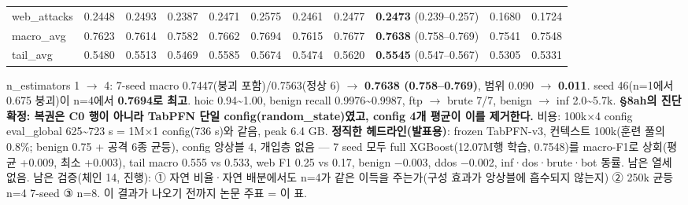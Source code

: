 \begin{landscape}
\begin{longtable}
{}web\_\allowbreak{}attacks & 0.2448 & 0.2493 & 0.2387 & 0.2471 & 0.2575 & 0.2461 & 0.2477 & \textbf{0.2473} (0.239–0.257) & 0.1680 & 0.1724 \\
{}macro\_\allowbreak{}avg & 0.7623 & 0.7614 & 0.7582 & 0.7662 & 0.7694 & 0.7615 & 0.7677 & \textbf{0.7638} (0.758–0.769) & 0.7541 & 0.7548 \\
{}tail\_\allowbreak{}avg & 0.5480 & 0.5513 & 0.5469 & 0.5585 & 0.5674 & 0.5474 & 0.5620 & \textbf{0.5545} (0.547–0.567) & 0.5305 & 0.5331 \\
\bottomrule
\end{longtable}
\endgroup
\end{landscape}
n\_\allowbreak{}estimators 1  \ensuremath{\rightarrow}  4: 7-seed macro 0.7447(붕괴 포함)/\allowbreak{}0.7563(정상 6)  \ensuremath{\rightarrow}  \textbf{0.7638 (0.758–0.769)}, 범위 0.090  \ensuremath{\rightarrow}  \textbf{0.011}. seed 46(n=\allowbreak{}1에서 0.675 붕괴)이 n=\allowbreak{}4에서 \textbf{0.7694로 최고}. hoic 0.94\textasciitilde{}1.00, benign recall 0.9976\textasciitilde{}0.9987, ftp \ensuremath{\rightarrow} brute 7/\allowbreak{}7, benign \ensuremath{\rightarrow} inf 2.0\textasciitilde{}5.7k. \textbf{§8ah의 진단 확정: 복권은 C0 행이 아니라 TabPFN 단일 config(random\_\allowbreak{}state)였고, config 4개 평균이 이를 제거한다.} 비용: 100k×4 config eval\_\allowbreak{}global 625\textasciitilde{}723 s =\allowbreak{} 1M×1 config(736 s)와 같음, peak 6.4 GB. \textbf{정직한 헤드라인(발표용)}: frozen TabPFN-v3, 컨텍스트 100k(훈련 풀의 0.8\%; benign 0.75 +\allowbreak{} 공격 6종 균등), config 앙상블 4, 개입층 없음 — 7 seed 모두 full XGBoost(12.07M행 학습, 0.7548)를 macro-F1로 상회(평균 +\allowbreak{}0.009, 최소 +\allowbreak{}0.003), tail macro 0.555 vs 0.533, web F1 0.25 vs 0.17, benign −0.003, ddos −0.002, inf·dos·brute·bot 동률. 남은 열세 없음. 남은 검증(체인 14, 진행): ① 자연 비율·자연 배분에서도 n=\allowbreak{}4가 같은 이득을 주는가(구성 효과가 앙상블에 흡수되지 않는지) ② 250k 균등 n=\allowbreak{}4 7-seed ③ n=\allowbreak{}8. 이 결과가 나오기 전까지 논문 주표 =\allowbreak{} 이 표.

